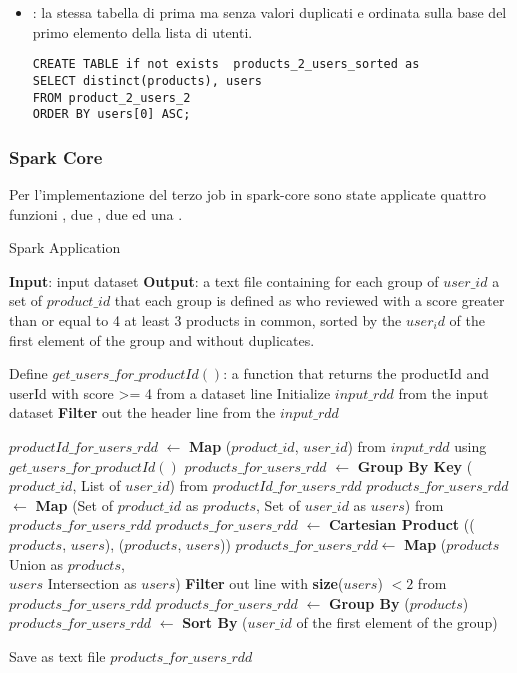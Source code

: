 \begin{itemize}
    \item {}: la stessa tabella di prima ma senza valori duplicati e ordinata sulla base del primo elemento della lista di utenti.
\begin{lstlisting}[style=all, style=SQLStyle]
CREATE TABLE if not exists  products_2_users_sorted as
SELECT distinct(products), users
FROM product_2_users_2
ORDER BY users[0] ASC;
\end{lstlisting}
\newpage

\end{itemize}
  \subsubsection{Spark Core}
      Per l'implementazione del terzo job in spark-core sono state applicate quattro funzioni , due , due  ed una .
  \begin{algorithm}
    \caption{Spark Application}
    \begin{algorithmic}[1]
        \STATE \textbf{Input}: input dataset
        \STATE \textbf{Output}: a text file containing for each group of $user\_id$ a set of $product\_id$ that each group is defined as who reviewed with a score greater than or equal to 4 at least 3 products in common, sorted by the $user_id$ of the first element of the group and without duplicates.
        
        \STATE Define $get\_users\_for\_productId()$: a function that returns the productId and userId with score >= 4 from a dataset line
        \STATE Initialize $input\_rdd$ from the input dataset
        \STATE \textbf{Filter} out the header line from the $input\_rdd$

        \STATE $productId\_for\_users\_rdd$ $\gets$ \textbf{Map} ($product\_id$, $user\_id$) from $input\_rdd$ using $get\_users\_for\_productId()$
        \STATE $products\_for\_users\_rdd$ $\gets$ \textbf{Group By Key} ($product\_id$, List of $user\_id$) from $productId\_for\_users\_rdd$
        \STATE $products\_for\_users\_rdd$ $\gets$ \textbf{Map} (Set of $product\_id$ as \textbf{$products$}, Set of $user\_id$ as \textbf{$users$}) from $products\_for\_users\_rdd$
            \STATE $products\_for\_users\_rdd$ $\gets$ \textbf{Cartesian Product} (($products$, $users$), ($products$, $users$))
            \STATE $products\_for\_users\_rdd \gets$ \textbf{Map} ($products$ Union as $products$, \\ $users$ Intersection as $users$)
            \STATE \textbf{Filter} out line with \textbf{size}($users$) $< 2$ from $products\_for\_users\_rdd$
        \ENDFOR
        \STATE $products\_for\_users\_rdd$ $\gets$ \textbf{Group By} ($products$) 
        \STATE $products\_for\_users\_rdd$ $\gets$ \textbf{Sort By} ($user\_id$ of the first element of the group) 

        \STATE Save as text file $products\_for\_users\_rdd$
    \end{algorithmic}
    \end{algorithm}
    
